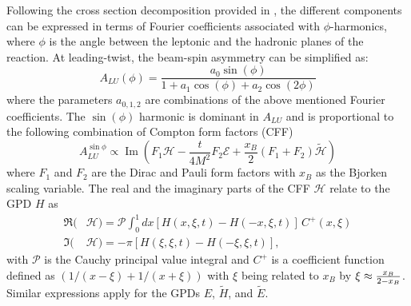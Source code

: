 \documentclass[twocolumn,nofootinbib,showpacs,prl,superscriptaddress,secnumarabic,amssymb,nobibnotes,aps,floatfix]{revtex4}
\begin{document}
Following the cross section decomposition provided in \cite{Belitsky:2001ns}, 
the different components can be expressed in terms of Fourier coefficients 
associated with $\phi$-harmonics, where $\phi$ is the angle between the 
leptonic and the hadronic planes of the reaction. At leading-twist, the 
beam-spin asymmetry can be simplified as: 
\begin{equation}
   A_{LU}(\phi) = \frac{a_{0}\sin(\phi)}{1+a_{1}\cos(\phi)+a_{2}\cos(2\phi)}
   \label{eq:alu-simp}
\end{equation}
where the parameters $a_{0,1,2}$ are combinations of the above mentioned Fourier 
coefficients. The $\sin(\phi)$ harmonic is dominant in $A_{LU}$ 
and is proportional to the following combination of Compton form factors (CFF) 
\cite{Guidal:2013rya}
\begin{equation}
   A_{LU}^{\sin\phi} \propto \operatorname{Im}( F_1 \mathcal{H}- \frac{t}{4M^2} 
   F_2 \mathcal{E}+ \frac{x_B}{2}(F_1+F_2)\tilde{\mathcal{H}})
\end{equation}
where $F_1$ and $F_2$ are the Dirac and Pauli form factors with $x_B$ as the 
Bjorken scaling variable. The real and the imaginary parts of the CFF 
$\mathcal{H}$ relate to the GPD $H$ as  
\begin{align}
   \Re(&\mathcal{H}) = \mathcal{P} \int_{0}^{1}dx[H(x,\xi,t)-H(-x,\xi,t)] \, 
   C^{+}(x,\xi) \\
   \Im(&\mathcal{H}) = - \pi [H(\xi,\xi,t)-H(-\xi,\xi,t)],
\end{align}
with $\mathcal{P}$ is the Cauchy principal value integral and $C^{+}$ is a 
coefficient function defined as $(1/(x-\xi) + 1/(x+\xi))$ with $\xi$ being 
related to $x_B$ by $\xi\approx {{x_B}\over{2-x_B}}$. Similar expressions apply 
for the GPDs $E$, $\widetilde{H}$, and $\widetilde{E}$.

\end{document}
